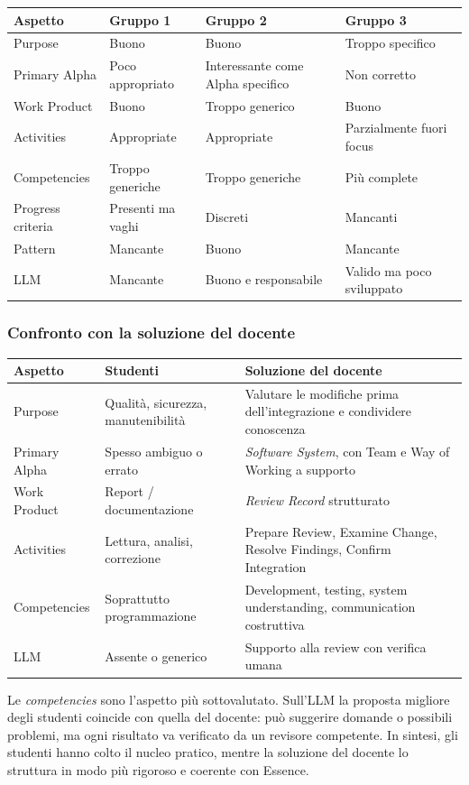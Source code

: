 \documentclass[a4paper,12pt]{article}
\begin{document}
\begin{center}
\begin{tabular}{|l|l|l|l|}
\hline
\textbf{Aspetto} & \textbf{Gruppo 1} & \textbf{Gruppo 2} & \textbf{Gruppo 3}\\
\hline
Purpose & Buono & Buono & Troppo specifico\\
Primary Alpha & Poco appropriato & Interessante come Alpha specifico & Non corretto\\
Work Product & Buono & Troppo generico & Buono\\
Activities & Appropriate & Appropriate & Parzialmente fuori focus\\
Competencies & Troppo generiche & Troppo generiche & Più complete\\
Progress criteria & Presenti ma vaghi & Discreti & Mancanti\\
Pattern & Mancante & Buono & Mancante\\
LLM & Mancante & Buono e responsabile & Valido ma poco sviluppato\\
\hline
\end{tabular}
\end{center}

\subsubsection{Confronto con la soluzione del docente}
\begin{center}
\begin{tabular}{|l|p{6cm}|p{6.5cm}|}
\hline
\textbf{Aspetto} & \textbf{Studenti} & \textbf{Soluzione del docente}\\
\hline
Purpose & Qualità, sicurezza, manutenibilità & Valutare le modifiche prima dell'integrazione e condividere conoscenza\\
Primary Alpha & Spesso ambiguo o errato & \emph{Software System}, con Team e Way of Working a supporto\\
Work Product & Report / documentazione & \emph{Review Record} strutturato\\
Activities & Lettura, analisi, correzione & Prepare Review, Examine Change, Resolve Findings, Confirm Integration\\
Competencies & Soprattutto programmazione & Development, testing, system understanding, communication costruttiva\\
LLM & Assente o generico & Supporto alla review con verifica umana\\
\hline
\end{tabular}
\end{center}
Le \emph{competencies} sono l'aspetto più sottovalutato. Sull'LLM la proposta migliore
degli studenti coincide con quella del docente: può suggerire domande o possibili
problemi, ma ogni risultato va verificato da un revisore competente. In sintesi, gli
studenti hanno colto il nucleo pratico, mentre la soluzione del docente lo struttura in
modo più rigoroso e coerente con Essence.
\end{document}
